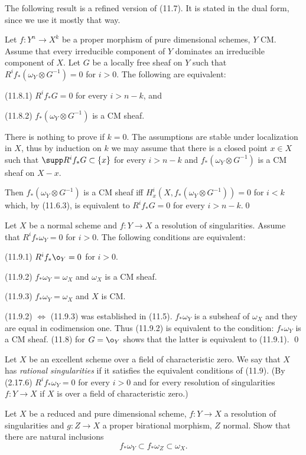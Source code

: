 The following result is a refined version of (11.7). It is stated in the dual
form, since we use it mostly that way.

 Let $f:Y^n\to X^k$ be a proper morphism of pure
dimensional schemes, $Y$ CM. Assume that every irreducible
component of $Y$ dominates an irreducible component of $X$.  Let $G$ be a
locally free sheaf on $Y$ such that
 $R^if_*(\omega_Y\otimes G^{-1})=0$ for $i>0$. 
The following are equivalent:

(11.8.1) $R^if_*G=0$ for every $i>n-k$, and

(11.8.2) $f_*(\omega_Y\otimes G^{-1})$ is a CM sheaf.
\endproclaim

\demop      There is nothing to prove if $k=0$.
The assumptions are stable under localization in $X$, thus by
induction on $k$ we may assume that there is a closed point
$x\in X$ such that $\supp R^if_*G\subset \{x\}$ for every $i>n-k$
and $f_*(\omega_Y\otimes G^{-1})$ is a CM sheaf on $X-x$. 

Then $f_*(\omega_Y\otimes G^{-1})$ is a CM sheaf iff
$H^i_x(X,f_*(\omega_Y\otimes G^{-1}))=0$ for $i<k$ which, by (11.6.3), is
equivalent to $R^if_*G=0$ for every $i>n-k$.\qed\enddemo


 \cite{KKMS73, p.50} 
Let $X$ be a  normal scheme   and $f:Y\to X$ a resolution of singularities.
Assume that  $R^if_*\omega_Y=0$ for $i>0$.
The  following  conditions are equivalent:

(11.9.1) $R^if_*\o_Y=0$ for $i>0$. 

(11.9.2) $f_*\omega_Y=\omega_X$ and $\omega_X$ is a CM sheaf.

(11.9.3) $f_*\omega_Y=\omega_X$ and $X$ is  CM.
\endproclaim

\demop  (11.9.2) $\Leftrightarrow$ (11.9.3) was established in (11.5). 
$f_*\omega_Y$ is a subsheaf of $\omega_X$ and they are equal in codimension
one. Thus (11.9.2) is equivalent to the condition:  $f_*\omega_Y$ is a CM sheaf.
 (11.8) for
$G=\o_Y$ shows that the latter is equivalent to (11.9.1). 
\qed\enddemo


 Let $X$ be an excellent scheme over a field of
characteristic zero. We say that
$X$ has {\it rational singularities} if 
 it
satisfies the     equivalent conditions of (11.9).
(By (2.17.6)   $R^if_*\omega_Y=0$ for every $i>0$ and for every  resolution of
singularities $f:Y\to X$ if $X$ is over a field of characteristic zero.)
\enddemo

 Let $X$ be a reduced and pure dimensional  scheme,
$f:Y\to X$ a resolution of singularities and $g:Z\to X$ a proper birational
morphism, $Z$ normal.  Show that there are natural inclusions
$$
f_*\omega_Y\subset f_*\omega_Z\subset \omega_X.
$$

